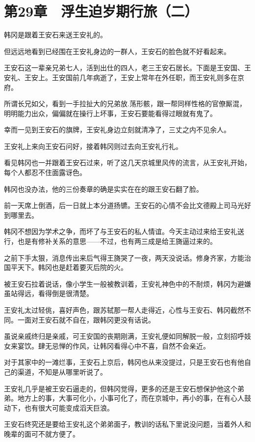 \section{第29章　浮生迫岁期行旅（二）}

韩冈是跟着王安石来送王安礼的。 

但远远地看到已经围在王安礼身边的一群人，王安石的脸色就不好看起来。 

王安石这一辈亲兄弟七人，活到出仕的四人，老三王安石居长。下面是王安国、王安礼、王安上。王安国前几年病逝了，王安上常年在外任职，而王安礼则多在京府。 

所谓长兄如父，看到一手拉扯大的兄弟放.荡形骸，跟一帮同样性格的官僚厮混，明明能力出众，偏偏就在操行上坏事，王安石要能看得过眼就有鬼了。 

幸而一见到王安石的旗牌，王安礼身边立刻就清净了，三丈之内不见余人。 

王安礼上来向王安石问好，接着韩冈则过去向王安礼行礼。 

看见韩冈也一并跟着王安石过来，听了这几天京城里风传的流言，从王安礼开始，每个人都忍不住面露讶色。 

韩冈也没办法，他的三份奏章的确是实实在在的跟王安石翻了脸。 

前一天席上倒酒，后一日就上本分道扬镳。王安石的心情不会比文德殿上司马光好到哪里去。 

韩冈不想因为学术之争，而坏了与王安石的私人情谊。今天主动过来给王安礼送行，也是有修补关系的意思——不过，也有两三成是给王旖逼过来的。 

之前下手太狠，消息传出来后气得王旖哭了一夜，两天没说话。修身齐家，方能治国平天下。韩冈也是赶着要灭后院的火。 

被王安石拉着说话，像小学生一般被教训着，王安礼神色中的不耐烦，韩冈为避嫌虽站得远，看得倒是很清楚。 

王安礼太过轻佻，喜好声色，跟苏轼那一帮人走得近，心性与王安石、韩冈截然不同。一面对王安石就不自在，跟韩冈更没有话说。 

虽说亲戚终归是亲戚，可王安国的丧期刚满，王安礼便如同解脱一般，立刻招呼妓女来宴饮。肆无忌惮的作风，让韩冈看得心中不喜，自然不会亲近。 

对于其家中的一滩烂事，王安石上京后，韩冈也从来没提过，只是王安石也有他自己的渠道，不知是从哪里听说了。 

王安礼几乎是被王安石逼走的，但韩冈觉得，更多的还是王安石想保护他这个弟弟。地方上的事，大事可化小，小事可化了，而在京城中，再小的事，在有心人鼓动下，也有很大可能变成滔天巨浪。 

王安石终究还是要给王安礼这个弟弟面子，教训的话私下里说没问题，当着外人和晚辈的面可不就方便了。 

